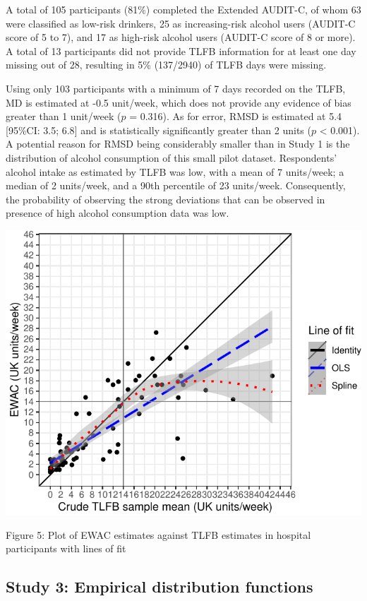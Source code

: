 \documentclass[]{article}
\begin{document}
A total of 105 participants (81\%) completed the Extended AUDIT-C, of
whom 63 were classified as low-risk drinkers, 25 as increasing-risk
alcohol users (AUDIT-C score of 5 to 7), and 17 as high-risk alcohol
users (AUDIT-C score of 8 or more). A total of 13 participants did not
provide TLFB information for at least one day missing out of 28,
resulting in 5\% (137/2940) of TLFB days were missing.

Using only 103 participants with a minimum of 7 days recorded on the
TLFB, MD is estimated at -0.5 unit/week, which does not provide any
evidence of bias greater than 1 unit/week (\(p\) = 0.316). As for error,
RMSD is estimated at 5.4 {[}95\%CI: 3.5; 6.8{]} and is statistically
significantly greater than 2 units (\(p\) \textless{} 0.001). A
potential reason for RMSD being considerably smaller than in Study 1 is
the distribution of alcohol consumption of this small pilot dataset.
Respondents' alcohol intake as estimated by TLFB was low, with a mean of
7 units/week; a median of 2 units/week, and a 90th percentile of 23
units/week. Consequently, the probability of observing the strong
deviations that can be observed in presence of high alcohol consumption
data was low.

\includegraphics{analysis_files/figure-latex/tlfb_scatterplot-1.pdf}

Figure 5: Plot of EWAC estimates against TLFB estimates in hospital
participants with lines of fit

\hypertarget{study-3-empirical-distribution-functions}{%
\subsection{Study 3: Empirical distribution
functions}\label{study-3-empirical-distribution-functions}}
\end{document}
